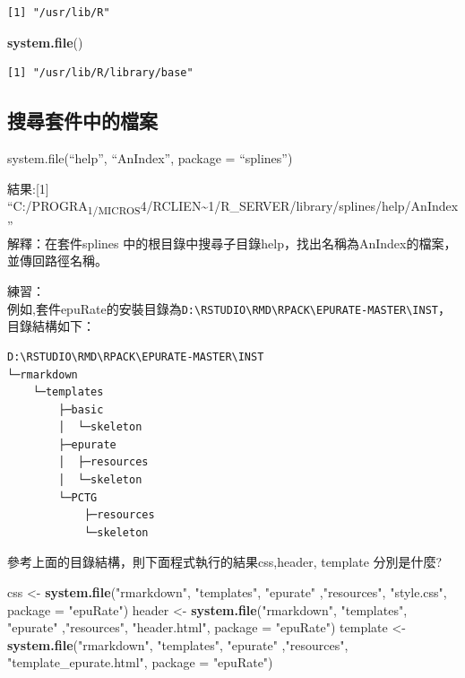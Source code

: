 \documentclass[]{book}
\newenvironment{Shaded}{\begin{snugshade}}{\end{snugshade}}
\newcommand{\DataTypeTok}[1]{\textcolor[rgb]{0.13,0.29,0.53}{#1}}
\newcommand{\KeywordTok}[1]{\textcolor[rgb]{0.13,0.29,0.53}{\textbf{#1}}}
\newcommand{\NormalTok}[1]{#1}
\newcommand{\StringTok}[1]{\textcolor[rgb]{0.31,0.60,0.02}{#1}}
\theoremstyle{definition}
\theoremstyle{definition}
\theoremstyle{definition}
\theoremstyle{remark}
\begin{document}
\begin{verbatim}
[1] "/usr/lib/R"
\end{verbatim}

\begin{Shaded}
\begin{Highlighting}[]
\KeywordTok{system.file}\NormalTok{()}
\end{Highlighting}
\end{Shaded}

\begin{verbatim}
[1] "/usr/lib/R/library/base"
\end{verbatim}

\subsection{搜尋套件中的檔案}

system.file(``help'', ``AnIndex'', package = ``splines'')

結果:{[}1{]}
``C:/PROGRA\textsubscript{1/MICROS}4/RCLIEN\textasciitilde{}1/R\_SERVER/library/splines/help/AnIndex''\\
解釋：在套件splines
中的根目錄中搜尋子目錄help，找出名稱為AnIndex的檔案，並傳回路徑名稱。

練習：\\
例如,套件epuRate的安裝目錄為\texttt{D:\textbackslash{}RSTUDIO\textbackslash{}RMD\textbackslash{}RPACK\textbackslash{}EPURATE-MASTER\textbackslash{}INST}，目錄結構如下：

\begin{verbatim}
D:\RSTUDIO\RMD\RPACK\EPURATE-MASTER\INST
└─rmarkdown
    └─templates
        ├─basic
        │  └─skeleton
        ├─epurate
        │  ├─resources
        │  └─skeleton
        └─PCTG
            ├─resources
            └─skeleton
\end{verbatim}

參考上面的目錄結構，則下面程式執行的結果css,header, template 分別是什麼?

\begin{Shaded}
\begin{Highlighting}[]
\NormalTok{  css <-}\StringTok{ }\KeywordTok{system.file}\NormalTok{(}\StringTok{"rmarkdown"}\NormalTok{, }\StringTok{"templates"}\NormalTok{, }\StringTok{"epurate"}\NormalTok{ ,}\StringTok{"resources"}\NormalTok{, }\StringTok{"style.css"}\NormalTok{, }\DataTypeTok{package =} \StringTok{"epuRate"}\NormalTok{)}
\NormalTok{  header <-}\StringTok{ }\KeywordTok{system.file}\NormalTok{(}\StringTok{"rmarkdown"}\NormalTok{, }\StringTok{"templates"}\NormalTok{, }\StringTok{"epurate"}\NormalTok{ ,}\StringTok{"resources"}\NormalTok{, }\StringTok{"header.html"}\NormalTok{, }\DataTypeTok{package =} \StringTok{"epuRate"}\NormalTok{)}
\NormalTok{  template <-}\StringTok{ }\KeywordTok{system.file}\NormalTok{(}\StringTok{"rmarkdown"}\NormalTok{, }\StringTok{"templates"}\NormalTok{, }\StringTok{"epurate"}\NormalTok{ ,}\StringTok{"resources"}\NormalTok{, }\StringTok{"template_epurate.html"}\NormalTok{, }\DataTypeTok{package =} \StringTok{"epuRate"}\NormalTok{)}
  
\end{Highlighting}
\end{Shaded}
\end{document}
